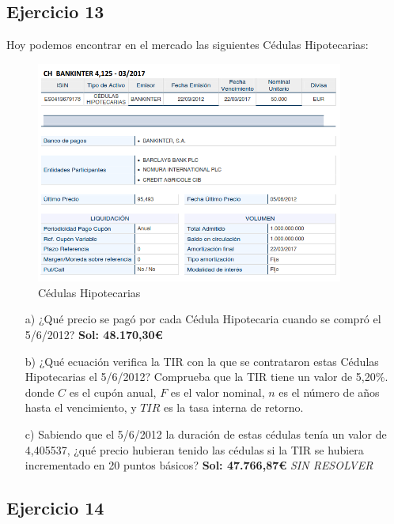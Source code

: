 \subsection*{Ejercicio 13}

Hoy podemos encontrar en el mercado las siguientes Cédulas Hipotecarias:

\begin{figure}[H]
    \centering
    \includegraphics[width=0.9\textwidth]{../images/ej13.png}
    \caption{Cédulas Hipotecarias}
    \label{fig:cedulas}
\end{figure}

\begin{itemize}
    \item[a)] ¿Qué precio se pagó por cada Cédula Hipotecaria cuando se compró el 5/6/2012? \textbf{Sol: 48.170,30€}
    \item[b)] ¿Qué ecuación verifica la TIR con la que se contrataron estas Cédulas Hipotecarias el 5/6/2012? Comprueba que la TIR tiene un valor de 5,20\%.
    donde \(C\) es el cupón anual, \(F\) es el valor nominal, \(n\) es el número de años hasta el vencimiento, y \(TIR\) es la tasa interna de retorno.
    \item[c)] Sabiendo que el 5/6/2012 la duración de estas cédulas tenía un valor de 4,405537, ¿qué precio hubieran tenido las cédulas si la TIR se hubiera incrementado en 20 puntos básicos? \textbf{Sol: 47.766,87€} \textit{SIN RESOLVER}
\end{itemize}


\subsection*{Ejercicio 14}

